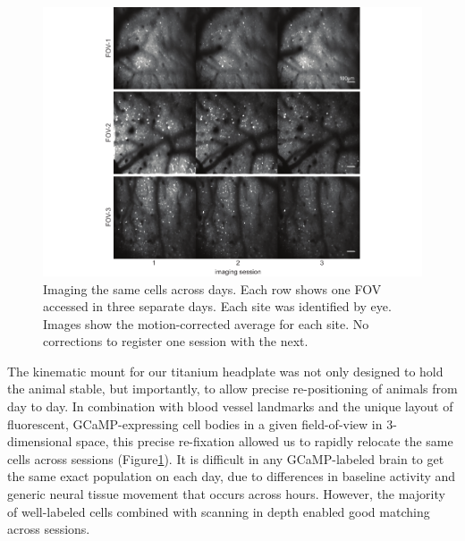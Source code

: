 \begin{figure}[t!]
    \includegraphics[width=\textwidth]{figures/chapter_2/fig_2-8_multiday_imaging/fig_2-8_multiday_imaging.pdf}
    \vspace{.1in}
    \caption[Multi-day imaging]{Imaging the same cells across days. Each row shows one FOV accessed in three separate days. Each site was identified by eye. Images show the motion-corrected average for each site. No corrections to register one session with the next.    
    \label{fig:multiday_imaging}}
\end{figure}

The kinematic mount for our titanium headplate was not only designed to hold the animal stable, but importantly, to allow precise re-positioning of animals from day to day. In combination with blood vessel landmarks and the unique layout of fluorescent, GCaMP-expressing cell bodies in a given field-of-view in 3-dimensional space, this precise re-fixation allowed us to rapidly relocate the same cells across sessions (Figure\ref{fig:multiday_imaging}). It is difficult in any GCaMP-labeled brain to get the same exact population on each day, due to differences in baseline activity and generic neural tissue movement that occurs across hours. However, the majority of well-labeled cells combined with scanning in depth enabled good matching across sessions. 

